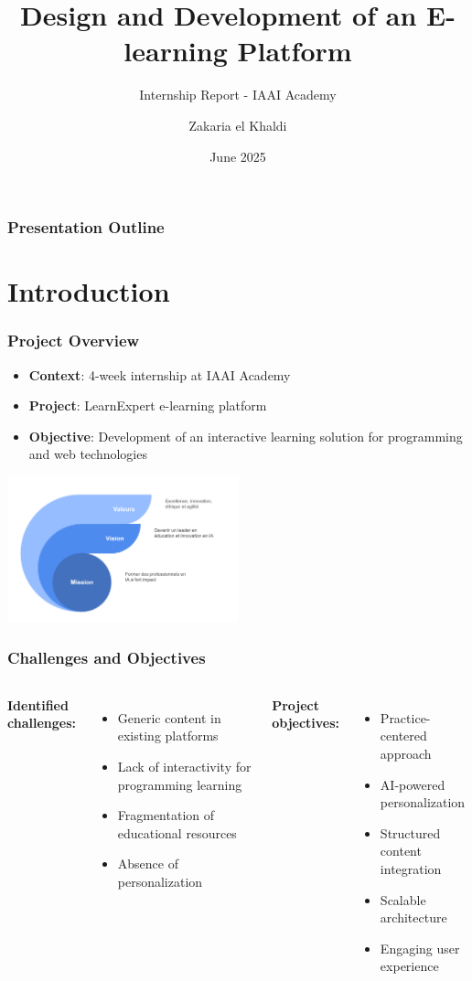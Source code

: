 \documentclass{beamer}
\title[LearnExpert Platform]{Design and Development of an E-learning Platform}
\subtitle{Internship Report - IAAI Academy}
\author[Zakaria el Khaldi]{Zakaria el Khaldi}
\institute[BTS Al-Kendi]{Al-Kendi BTS Center, Casablanca}
\date{June 2025}
\begin{document}
\frame{\titlepage}

\begin{frame}
\frametitle{Presentation Outline}
\tableofcontents
\end{frame}

\section{Introduction}

\begin{frame}
\frametitle{Project Overview}
\begin{itemize}
    \item \textbf{Context}: 4-week internship at IAAI Academy
    \item \textbf{Project}: LearnExpert e-learning platform
    \item \textbf{Objective}: Development of an interactive learning solution for programming and web technologies
\end{itemize}
\begin{center}
    \includegraphics[width=0.5\textwidth]{images/mession.png}
\end{center}
\end{frame}

\begin{frame}
\frametitle{Challenges and Objectives}
\begin{columns}
\textbf{Identified challenges:}
\begin{itemize}
    \item Generic content in existing platforms
    \item Lack of interactivity for programming learning
    \item Fragmentation of educational resources
    \item Absence of personalization
\end{itemize}

\textbf{Project objectives:}
\begin{itemize}
    \item Practice-centered approach
    \item AI-powered personalization
    \item Structured content integration
    \item Scalable architecture
    \item Engaging user experience
\end{itemize}
\end{columns}
\end{frame}
\end{document}
